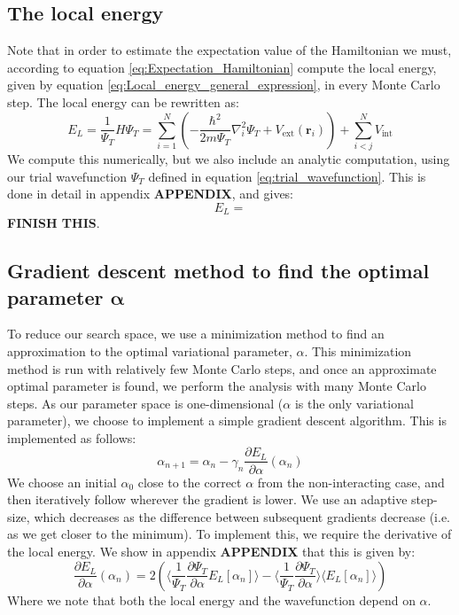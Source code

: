 \documentclass[a4paper, 10pt]{article}
\begin{document}
	\subsection{The local energy}
	Note that in  order to estimate the expectation value of the Hamiltonian we must, according to equation \ref{eq:Expectation_Hamiltonian} compute the local energy, given by equation \ref{eq:Local_energy_general_expression}, in every Monte Carlo step. The local energy can be rewritten as:
	\begin{equation}
	E_L=\frac{1}{\Psi_T}H\Psi_T =\sum_{i=1}^N\left(-\frac{\hbar^2}{2m\Psi_T}\nabla_i^2 \Psi_T+V_{\mathrm{ext}}(\boldsymbol{r}_i)\right)+\sum_{i<j}^N V_{\mathrm{int}}
	\end{equation}
	We compute this numerically, but we also include an analytic computation, using our trial wavefunction $\Psi_T$ defined in equation \ref{eq:trial_wavefunction}. This is done in detail in appendix \textbf{APPENDIX}, and gives:
	\begin{equation}
	E_L=
	\end{equation}
	\textbf{FINISH THIS}.
	
	
	
	\subsection{Gradient descent method to find the optimal parameter $\boldsymbol{\alpha}$}
	To reduce our search space, we use a minimization method to find an approximation to the optimal variational parameter, $\alpha$. This minimization method is run with relatively few Monte Carlo steps, and once an approximate optimal parameter is found, we perform the analysis with many Monte Carlo steps. As our parameter space is one-dimensional ($\alpha$ is the only variational parameter), we choose to implement a simple gradient descent algorithm. This is implemented as follows:
	\begin{equation}
	\alpha_{n+1}=\alpha_n-\gamma_n \frac{\partial E_L}{\partial \alpha} (\alpha_n)
	\end{equation}
	We choose an initial $\alpha_0$ close to the correct $\alpha$ from the non-interacting case, and then iteratively follow wherever the gradient is lower. We use an adaptive step-size, which decreases as the difference between subsequent gradients decrease (i.e. as we get closer to the minimum).  To implement this, we require the derivative of the local energy. We show in appendix \textbf{APPENDIX} that this is given by:
	\begin{equation}
	\frac{\partial E_L}{\partial \alpha}(\alpha_n)=2\left(\big\langle \frac{1}{\Psi_T}\frac{\partial \Psi_T}{\partial \alpha}E_L[\alpha_n]\big\rangle-\big\langle \frac{1}{\Psi_T}\frac{\partial \Psi_T}{\partial \alpha}\big\rangle \big\langle E_L[\alpha_n]\big\rangle\right)
	\end{equation}
	Where we note that both the local energy and the wavefunction depend on $\alpha$.
\end{document}

